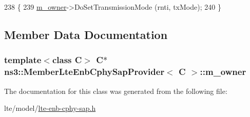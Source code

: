 \begin{DoxyCode}
238 \{
239   \hyperlink{classns3_1_1MemberLteEnbCphySapProvider_aaea8c068a9ce35ba5bb28dfdd686dde6}{m\_owner}->DoSetTransmissionMode (rnti, txMode);
240 \}
\end{DoxyCode}


\subsection{Member Data Documentation}
\subsubsection[{\texorpdfstring{m\+\_\+owner}{m_owner}}]{\setlength{\rightskip}{0pt plus 5cm}template$<$class C$>$ {\bf C}$\ast$ {\bf ns3\+::\+Member\+Lte\+Enb\+Cphy\+Sap\+Provider}$<$ {\bf C} $>$\+::m\+\_\+owner\hspace{0.3cm}{\ttfamily [private]}}\hypertarget{classns3_1_1MemberLteEnbCphySapProvider_aaea8c068a9ce35ba5bb28dfdd686dde6}{}\label{classns3_1_1MemberLteEnbCphySapProvider_aaea8c068a9ce35ba5bb28dfdd686dde6}


The documentation for this class was generated from the following file\+:\begin{DoxyCompactItemize}
\item 
lte/model/\hyperlink{lte-enb-cphy-sap_8h}{lte-\/enb-\/cphy-\/sap.\+h}\end{DoxyCompactItemize}
